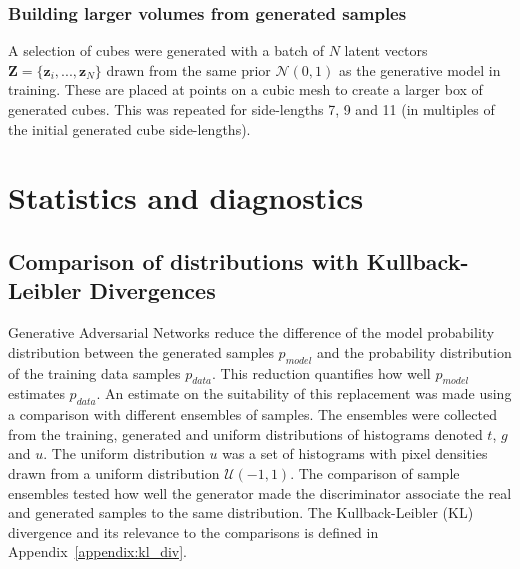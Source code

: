 \documentclass[twocolumn]{article}
\numberwithin{equation}{section}
\begin{document}
\subsubsection{Building larger volumes from generated samples}
A selection of cubes were generated with a batch of $N$ latent vectors $\mathbf{Z}=\{\mathbf{z}_i, ..., \mathbf{z}_N\}$ drawn 
from the same prior $\mathcal{N}(0,1)$ as the generative model in training. These are placed at points on a cubic mesh to 
create a larger box of generated cubes. This was repeated for side-lengths 7, 9 and 11 (in multiples of the initial generated 
cube side-lengths). 


\section{Statistics and diagnostics}\label{sec:stats_and_diags}

\subsection{Comparison of distributions with Kullback-Leibler Divergences}
Generative Adversarial Networks reduce the difference of the model probability distribution between the generated samples 
$p_{model}$ and the probability distribution of the training data samples $p_{data}$. This reduction quantifies how well 
$p_{model}$ estimates $p_{data}$. An estimate on the suitability of this replacement was made using a comparison with 
different ensembles of samples. The ensembles were collected from the training, generated and uniform distributions of 
histograms denoted $t$, $g$ and $u$. The uniform distribution $u$ was a set of histograms with pixel densities drawn from 
a uniform distribution $\mathcal{U}(-1,1)$. The comparison of sample ensembles tested how well the generator made the 
discriminator associate the real and generated samples to the same distribution. The Kullback-Leibler (KL) divergence and 
its relevance to the comparisons is defined in Appendix~\ref{appendix:kl_div}.
\end{document}
